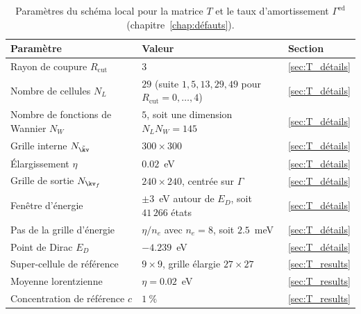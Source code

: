 \begin{table}[htbp]
    \centering
    \caption[Paramètres de la matrice $T$ et du taux d'amortissement $\Gamma^\text{ed}$.]{Paramètres du schéma local pour la matrice $T$ et le taux d'amortissement $\Gamma^\text{ed}$ (chapitre~\ref{chap:défauts}).}
    \label{tab:param_T}
    \small
    \setlength{\tabcolsep}{4pt}
    \begin{tabular}{p{} p{} p{}}
        \hline\hline
        Paramètre & Valeur & Section \\
        \hline
        Rayon de coupure $R_\text{cut}$ & $3$ & \ref{sec:T_détails} \\
        Nombre de cellules $N_L$ & $29$ (suite $1, 5, 13, 29, 49$ pour $R_\text{cut} = 0, \dots, 4$) & \ref{sec:T_détails} \\
        Nombre de fonctions de Wannier $N_W$ & $5$, soit une dimension $N_LN_W = 145$ & \ref{sec:T_détails} \\
        Grille interne $N_{\tilde\kv}$ & $300\times 300$ & \ref{sec:T_détails} \\
        Élargissement $\eta$ & $0.02$~eV & \ref{sec:T_détails} \\
        Grille de sortie $N_{\kv_f}$ & $240\times 240$, centrée sur $\Gamma$ & \ref{sec:T_détails} \\
        Fenêtre d'énergie & $\pm 3$~eV autour de $E_D$, soit $41\,266$ états & \ref{sec:T_détails} \\
        Pas de la grille d'énergie & $\eta/n_e$ avec $n_e = 8$, soit $2.5$~meV & \ref{sec:T_détails} \\
        Point de Dirac $E_D$ & $-4.239$~eV & \ref{sec:T_détails} \\
        Super-cellule de référence & $9\times 9$, grille élargie $27\times 27$ & \ref{sec:T_results} \\
        Moyenne lorentzienne & $\eta = 0.02$~eV & \ref{sec:T_results} \\
        Concentration de référence $c$ & $1~\%$ & \ref{sec:T_results} \\
        \hline\hline
    \end{tabular}
\end{table}


